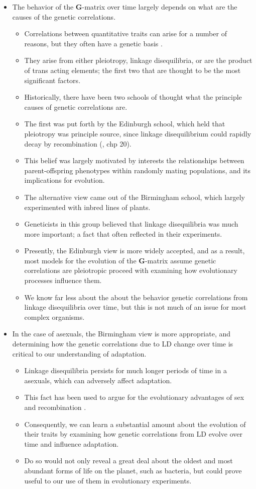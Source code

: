 \documentclass[11pt,one column]{article}
\begin{document}
\begin{itemize}
\item The behavior of the \textbf{G}-matrix over time largely depends on what are the causes of the genetic correlations.
\begin{itemize}
\item Correlations between quantitative traits can arise for a number of reasons, but they often have a genetic basis \cite{Saltz2017}.
\item They arise from either pleiotropy, linkage disequilibria, or are the product of trans acting elements; the first two that are thought to be the most significant factors.
\item Historically, there have been two schools of thought what the principle causes of genetic correlations are.
\item The first was put forth by the Edinburgh school, which held that pleiotropy was principle source, since linkage disequilibrium could rapidly decay by recombination (\cite{fox2006evolutionary}, chp 20).
\item This belief was largely motivated by interests the relationships between parent-offspring phenotypes within randomly mating populations, and its implications for evolution.
\item The alternative view came out of the Birmingham school, which largely experimented with inbred lines of plants.
\item Geneticists in this group believed that linkage disequilibria was much more important; a fact that often reflected in their experiments.
\item Presently, the Edinburgh view is more widely accepted, and as a result, most models for the evolution of the \textbf{G}-matrix assume genetic correlations are pleiotropic proceed with examining how evolutionary processes influence them.
\item We know far less about the about the behavior genetic correlations from linkage disequilibria over time, but this is not much of an issue for most complex organisms.
\end{itemize}

\item In the case of asexuals, the Birmingham view is more appropriate, and determining how the genetic correlations due to LD change over time is critical to our understanding of adaptation.
\begin{itemize}
\item Linkage disequilibria persists for much longer periods of time in a asexuals, which can adversely affect adaptation.
\item This fact has been used to argue for the evolutionary advantages of sex and recombination \cite{Barton2005}.
\item Consequently, we can learn a substantial amount about the evolution of their traits by examining how genetic correlations from LD evolve over time and influence adaptation.
\item Do so would not only reveal a great deal about the oldest and most abundant forms of life on the planet, such as bacteria, but could prove useful to our use of them in evolutionary experiments.
\end{itemize}


\end{itemize}
\end{document}
